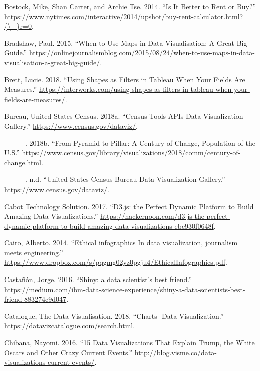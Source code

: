 \documentclass[]{book}
\theoremstyle{definition}
\theoremstyle{definition}
\theoremstyle{definition}
\theoremstyle{remark}
\begin{document}
\hypertarget{ref-rent_or_buy}{}
Bostock, Mike, Shan Carter, and Archie Tse. 2014. ``Is It Better to Rent
or Buy?''
\href{https://www.nytimes.com/interactive/2014/upshot/buy-rent-calculator.html?\%7B/_\%7Dr=0}{https://www.nytimes.com/interactive/2014/upshot/buy-rent-calculator.html?\{\textbackslash{}\_\}r=0}.

\hypertarget{ref-Bradshaw}{}
Bradshaw, Paul. 2015. ``When to Use Maps in Data Visualisation: A Great
Big Guide.''
\url{https://onlinejournalismblog.com/2015/08/24/when-to-use-maps-in-data-visualisation-a-great-big-guide/}.

\hypertarget{ref-measures}{}
Brett, Lucie. 2018. ``Using Shapes as Filters in Tableau When Your
Fields Are Measures.''
\url{https://interworks.com/using-shapes-as-filters-in-tableau-when-your-fields-are-measures/}.

\hypertarget{ref-CensusDataViz}{}
Bureau, United States Census. 2018a. ``Census Tools APIs Data
Visualization Gallery.'' \url{https://www.census.gov/dataviz/}.

\hypertarget{ref-population_pyramid}{}
---------. 2018b. ``From Pyramid to Pillar: A Century of Change,
Population of the U.S.''
\url{https://www.census.gov/library/visualizations/2018/comm/century-of-change.html}.

\hypertarget{ref-census_viz}{}
---------. n.d. ``United States Census Bureau Data Visualization
Gallery.'' \url{https://www.census.gov/dataviz/}.

\hypertarget{ref-d3_interactive_viz}{}
Cabot Technology Solution. 2017. ``D3.js: the Perfect Dynamic Platform
to Build Amazing Data Visualizations.''
\url{https://hackernoon.com/d3-js-the-perfect-dynamic-platform-to-build-amazing-data-visualizations-ebe930f0648f}.

\hypertarget{ref-ethical_infographics}{}
Cairo, Alberto. 2014. ``Ethical infographics In data visualization,
journalism meets engineering.''
\url{https://www.dropbox.com/s/pqgmg02yz0pgju4/EthicalInfographics.pdf}.

\hypertarget{ref-shiny_interactive_viz}{}
Castañón, Jorge. 2016. ``Shiny: a data scientist's best friend.''
\url{https://medium.com/ibm-data-science-experience/shiny-a-data-scientists-best-friend-883274c9d047}.

\hypertarget{ref-charts_viz}{}
Catalogue, The Data Visualisation. 2018. ``Charts- Data Visualization.''
\url{https://datavizcatalogue.com/search.html}.

\hypertarget{ref-int_viz_current}{}
Chibana, Nayomi. 2016. ``15 Data Visualizations That Explain Trump, the
White Oscars and Other Crazy Current Events.''
\url{http://blog.visme.co/data-visualizations-current-events/}.
\end{document}
